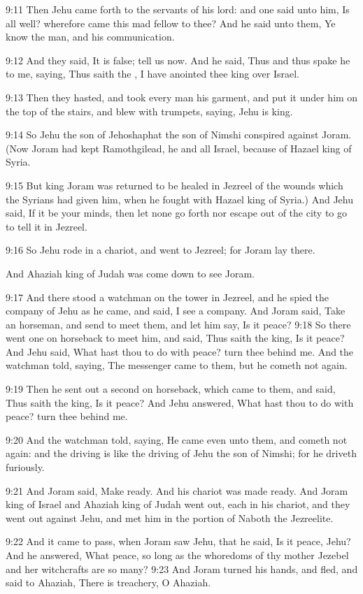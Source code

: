 9:11 Then Jehu came forth to the servants of his lord: and one said
unto him, Is all well? wherefore came this mad fellow to thee? And he
said unto them, Ye know the man, and his communication.

9:12 And they said, It is false; tell us now. And he said, Thus and
thus spake he to me, saying, Thus saith the \LORD, I have anointed thee
king over Israel.

9:13 Then they hasted, and took every man his garment, and put it
under him on the top of the stairs, and blew with trumpets, saying,
Jehu is king.

9:14 So Jehu the son of Jehoshaphat the son of Nimshi conspired
against Joram. (Now Joram had kept Ramothgilead, he and all Israel,
because of Hazael king of Syria.

9:15 But king Joram was returned to be healed in Jezreel of the wounds
which the Syrians had given him, when he fought with Hazael king of
Syria.)  And Jehu said, If it be your minds, then let none go forth
nor escape out of the city to go to tell it in Jezreel.

9:16 So Jehu rode in a chariot, and went to Jezreel; for Joram lay
there.

And Ahaziah king of Judah was come down to see Joram.

9:17 And there stood a watchman on the tower in Jezreel, and he spied
the company of Jehu as he came, and said, I see a company. And Joram
said, Take an horseman, and send to meet them, and let him say, Is it
peace?  9:18 So there went one on horseback to meet him, and said,
Thus saith the king, Is it peace? And Jehu said, What hast thou to do
with peace? turn thee behind me. And the watchman told, saying, The
messenger came to them, but he cometh not again.

9:19 Then he sent out a second on horseback, which came to them, and
said, Thus saith the king, Is it peace? And Jehu answered, What hast
thou to do with peace? turn thee behind me.

9:20 And the watchman told, saying, He came even unto them, and cometh
not again: and the driving is like the driving of Jehu the son of
Nimshi; for he driveth furiously.

9:21 And Joram said, Make ready. And his chariot was made ready. And
Joram king of Israel and Ahaziah king of Judah went out, each in his
chariot, and they went out against Jehu, and met him in the portion of
Naboth the Jezreelite.

9:22 And it came to pass, when Joram saw Jehu, that he said, Is it
peace, Jehu? And he answered, What peace, so long as the whoredoms of
thy mother Jezebel and her witchcrafts are so many?  9:23 And Joram
turned his hands, and fled, and said to Ahaziah, There is treachery, O
Ahaziah.

